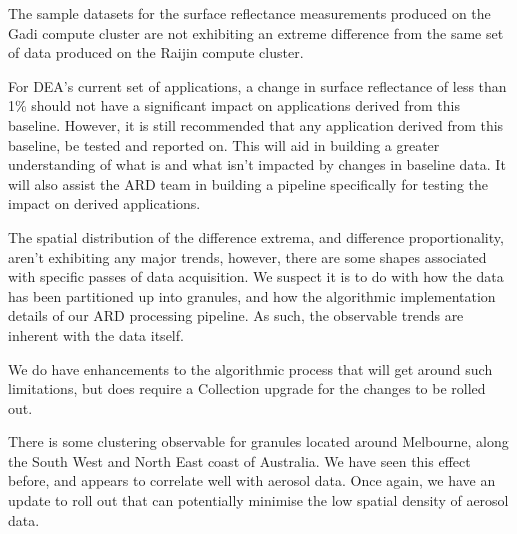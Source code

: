 \documentclass[a4paper]{article}
\begin{document}
    \begin{flushleft}
      The sample datasets for the surface reflectance measurements produced on the Gadi compute cluster are not exhibiting an extreme difference from the same set of data produced on the Raijin compute cluster. \par
      For DEA's current set of applications, a change in surface reflectance of less than 1\% should not have a significant impact on applications derived from this baseline. However, it is still recommended that any application derived from this baseline, be tested and reported on. This will aid in building a greater understanding of what is and what isn't impacted by changes in baseline data. It will also assist the ARD team in building a pipeline specifically for testing the impact on derived applications. \par
      The spatial distribution of the difference extrema, and difference proportionality, aren't exhibiting any major trends, however, there are some shapes associated with specific passes of data acquisition. We suspect it is to do with how the data has been partitioned up into granules, and how the algorithmic implementation details of our ARD processing pipeline. As such, the observable trends are inherent with the data itself. \par
      We do have enhancements to the algorithmic process that will get around such limitations, but does require a Collection upgrade for the changes to be rolled out. \par
      There is some clustering observable for granules located around Melbourne, along the South West and North East coast of Australia. We have seen this effect before, and appears to correlate well with aerosol data. Once again, we have an update to roll out that can potentially minimise the low spatial density of aerosol data.
    \end{flushleft}
\end{document}
